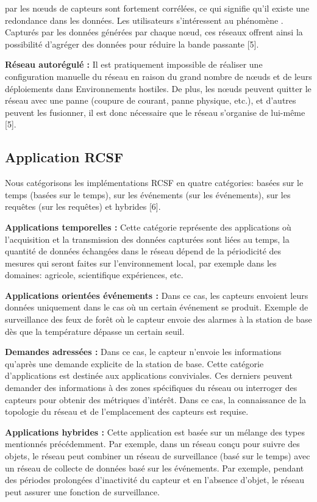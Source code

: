 \documentclass[paper=a4, fontsize=11pt]{scrartcl}
\numberwithin{equation}{section}		%
\numberwithin{figure}{section}			%
\numberwithin{table}{section}				%
\begin{document}
par les nœuds de capteurs sont fortement corrélées, ce qui signifie qu'il existe une
redondance dans les données. Les utilisateurs s'intéressent au phénomène .
Capturés par les données générées par chaque nœud, ces réseaux offrent ainsi la
possibilité d'agréger des données pour réduire la bande passante [5].\par
 \textbf{Réseau autorégulé :}
Il est pratiquement impossible de réaliser une configuration manuelle du réseau en
raison du grand nombre de nœuds et de leurs déploiements dans
Environnements hostiles. De plus, les nœuds peuvent quitter le réseau avec une
panne (coupure de courant, panne physique, etc.), et d'autres peuvent les fusionner,
il est donc nécessaire que le réseau s'organise de lui-même [5].\par
\subsection{Application RCSF}
Nous catégorisons les implémentations RCSF en quatre catégories: basées sur le
temps (basées sur le temps), sur les événements (sur les événements), sur les
requêtes (sur les requêtes) et hybrides [6].\par
\textbf{ Applications temporelles :}
Cette catégorie représente des applications où l'acquisition et la transmission des
données capturées sont liées au temps, la quantité de données échangées dans le
réseau dépend de la périodicité des mesures qui seront faites sur l'environnement
local, par exemple dans les domaines: agricole, scientifique expériences, etc.\par
\textbf{ Applications orientées événements :}
Dans ce cas, les capteurs envoient leurs données uniquement dans le cas où un
certain événement se produit. Exemple de surveillance des feux de forêt où le
capteur envoie des alarmes à la station de base dès que la température dépasse un
certain seuil.\par
\textbf{Demandes adressées :}
Dans ce cas, le capteur n'envoie les informations qu'après une demande explicite de
la station de base. Cette catégorie d'applications est destinée aux applications
conviviales. Ces derniers peuvent demander des informations à des zones
spécifiques du réseau ou interroger des capteurs pour obtenir des métriques d'intérêt.
Dans ce cas, la connaissance de la topologie du réseau et de l'emplacement des
capteurs est requise.\par
\textbf{ Applications hybrides :}
Cette application est basée sur un mélange des types mentionnés précédemment. Par
exemple, dans un réseau conçu pour suivre des objets, le réseau peut combiner un 
réseau de surveillance (basé sur le temps) avec un réseau de collecte de données
basé sur les événements. Par exemple, pendant des périodes prolongées d'inactivité
du capteur et en l'absence d'objet, le réseau peut assurer une fonction de
surveillance.
\end{document}
